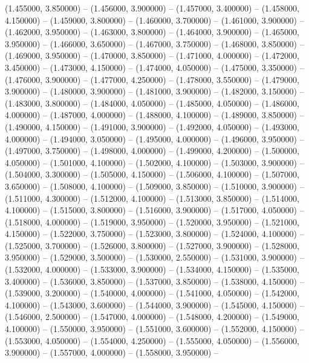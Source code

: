 (1.455000, 3.850000) -- 
(1.456000, 3.900000) -- 
(1.457000, 3.400000) -- 
(1.458000, 4.150000) -- 
(1.459000, 3.800000) -- 
(1.460000, 3.700000) -- 
(1.461000, 3.900000) -- 
(1.462000, 3.950000) -- 
(1.463000, 3.800000) -- 
(1.464000, 3.900000) -- 
(1.465000, 3.950000) -- 
(1.466000, 3.650000) -- 
(1.467000, 3.750000) -- 
(1.468000, 3.850000) -- 
(1.469000, 3.950000) -- 
(1.470000, 3.850000) -- 
(1.471000, 4.000000) -- 
(1.472000, 3.450000) -- 
(1.473000, 4.150000) -- 
(1.474000, 4.050000) -- 
(1.475000, 3.350000) -- 
(1.476000, 3.900000) -- 
(1.477000, 4.250000) -- 
(1.478000, 3.550000) -- 
(1.479000, 3.900000) -- 
(1.480000, 3.900000) -- 
(1.481000, 3.900000) -- 
(1.482000, 3.150000) -- 
(1.483000, 3.800000) -- 
(1.484000, 4.050000) -- 
(1.485000, 4.050000) -- 
(1.486000, 4.000000) -- 
(1.487000, 4.000000) -- 
(1.488000, 4.100000) -- 
(1.489000, 3.850000) -- 
(1.490000, 4.150000) -- 
(1.491000, 3.900000) -- 
(1.492000, 4.050000) -- 
(1.493000, 4.000000) -- 
(1.494000, 3.050000) -- 
(1.495000, 4.000000) -- 
(1.496000, 3.950000) -- 
(1.497000, 3.750000) -- 
(1.498000, 4.000000) -- 
(1.499000, 4.200000) -- 
(1.500000, 4.050000) -- 
(1.501000, 4.100000) -- 
(1.502000, 4.100000) -- 
(1.503000, 3.900000) -- 
(1.504000, 3.300000) -- 
(1.505000, 4.150000) -- 
(1.506000, 4.100000) -- 
(1.507000, 3.650000) -- 
(1.508000, 4.100000) -- 
(1.509000, 3.850000) -- 
(1.510000, 3.900000) -- 
(1.511000, 4.300000) -- 
(1.512000, 4.100000) -- 
(1.513000, 3.850000) -- 
(1.514000, 4.100000) -- 
(1.515000, 3.800000) -- 
(1.516000, 3.900000) -- 
(1.517000, 4.050000) -- 
(1.518000, 4.000000) -- 
(1.519000, 3.950000) -- 
(1.520000, 3.950000) -- 
(1.521000, 4.150000) -- 
(1.522000, 3.750000) -- 
(1.523000, 3.800000) -- 
(1.524000, 4.100000) -- 
(1.525000, 3.700000) -- 
(1.526000, 3.800000) -- 
(1.527000, 3.900000) -- 
(1.528000, 3.950000) -- 
(1.529000, 3.500000) -- 
(1.530000, 2.550000) -- 
(1.531000, 3.900000) -- 
(1.532000, 4.000000) -- 
(1.533000, 3.900000) -- 
(1.534000, 4.150000) -- 
(1.535000, 3.400000) -- 
(1.536000, 3.850000) -- 
(1.537000, 3.850000) -- 
(1.538000, 4.150000) -- 
(1.539000, 3.200000) -- 
(1.540000, 4.000000) -- 
(1.541000, 4.050000) -- 
(1.542000, 4.100000) -- 
(1.543000, 3.600000) -- 
(1.544000, 3.900000) -- 
(1.545000, 4.150000) -- 
(1.546000, 2.500000) -- 
(1.547000, 4.000000) -- 
(1.548000, 4.200000) -- 
(1.549000, 4.100000) -- 
(1.550000, 3.950000) -- 
(1.551000, 3.600000) -- 
(1.552000, 4.150000) -- 
(1.553000, 4.050000) -- 
(1.554000, 4.250000) -- 
(1.555000, 4.050000) -- 
(1.556000, 3.900000) -- 
(1.557000, 4.000000) -- 
(1.558000, 3.950000) -- 
